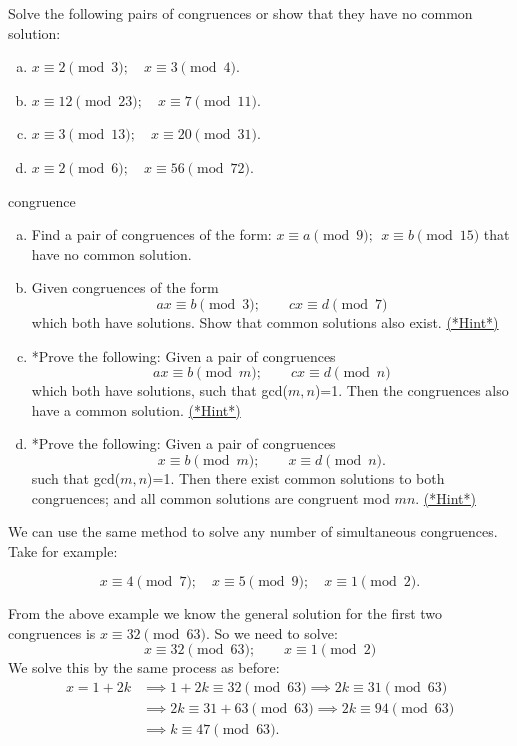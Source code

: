\begin{exercise}{91}
Solve the following pairs of congruences or show that they have no common solution:
\begin{enumerate}[(a)]
\item
$x \equiv 2 \pmod{3}; \quad x \equiv 3 \pmod{4}.$
\item
$x \equiv 12 \pmod{23}; \quad x \equiv 7 \pmod{11}.$
\item
$x \equiv 3 \pmod{13}; \quad x \equiv 20 \pmod{31}.$
\item
$x \equiv 2 \pmod{6}; \quad  x \equiv 56 \pmod{72}.$
\end {enumerate}
\end {exercise}

\begin{exercise}{congruence}
\begin{enumerate}[(a)]
\item
Find a pair of congruences of the form: $x \equiv a \pmod{9};~~x \equiv b \pmod{15}$ that have no common solution.
\item
Given congruences of the form 
\[ ax \equiv b \pmod{3}; \qquad cx \equiv d \pmod{7} \]
which both have solutions.  Show that  common solutions also exist.
 \hyperref[sec:modular_arithmetic:hints]{(*Hint*)}
\item
*Prove the following: Given a pair of congruences
\[ ax \equiv b \pmod{m}; \qquad cx \equiv d \pmod{n} \]
 which both have solutions, such that gcd($m,n$)=1. Then the congruences also have a common solution.
 \hyperref[sec:modular_arithmetic:hints]{(*Hint*)}
\item
*Prove the following: Given a pair of congruences
\[ x \equiv b \pmod{m}; \qquad x \equiv d \pmod{n}. \]
 such that gcd($m,n$)=1. Then there exist common solutions to both congruences; and all common solutions are congruent mod $mn$.
 \hyperref[sec:modular_arithmetic:hints]{(*Hint*)}
\end{enumerate}
\end{exercise}


We can use the same method to solve any number of simultaneous congruences. Take for example:

\[x \equiv 4 \pmod 7; \quad x \equiv 5 \pmod 9; \quad x \equiv 1 \pmod 2.\]

From the above example we know the general solution for the first two congruences  is $x \equiv 32 \pmod {63}$.  So we need to solve:
\[x \equiv 32 \pmod {63}; \qquad x \equiv 1 \pmod 2\]
We solve this by the same process as before: 
\begin{align*}
x = 1 + 2k &\implies 1 + 2k \equiv 32 \pmod {63} \implies 2k \equiv 31 \pmod {63}\\
&\implies 2k \equiv 31+63 \pmod {63} \implies 2k \equiv 94 \pmod {63} \\
&\implies k \equiv 47 \pmod {63}.
\end{align*}

